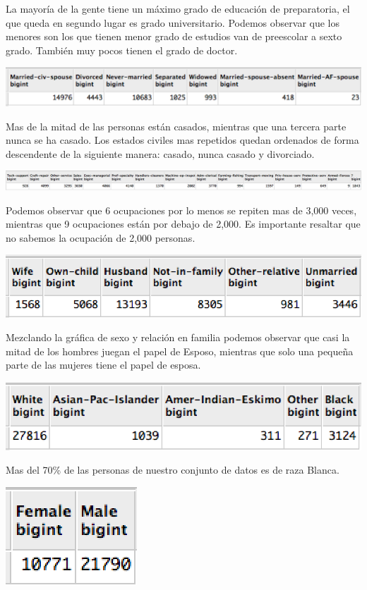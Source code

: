 \documentclass{article}
\begin{document}
  La mayoría de la gente tiene un máximo grado de educación de  preparatoria, el que queda en segundo lugar es grado universitario. Podemos observar que los menores son los que tienen menor grado de estudios van de preescolar a sexto grado. También muy pocos tienen el grado de doctor.
  \begin{center}
    \includegraphics[scale=0.5]{tablas/maritalstatus}
  \end{center}
  Mas de la mitad de las personas están casados, mientras que una tercera parte nunca se ha casado. Los estados civiles mas repetidos quedan ordenados de forma descendente de la siguiente manera: casado, nunca casado y divorciado.
  \begin{center}
    \includegraphics[scale=0.5]{tablas/occupation}
  \end{center}
  Podemos observar que 6 ocupaciones por lo menos se repiten mas de 3,000 veces, mientras que 9 ocupaciones están por debajo de 2,000. Es importante resaltar que no sabemos la ocupación de 2,000 personas.
  \begin{center}
    \includegraphics{tablas/relationship}
  \end{center}
  Mezclando la gráfica de sexo y relación en familia podemos observar que casi la mitad de los hombres juegan el papel de Esposo, mientras que solo una pequeña parte de las mujeres tiene el papel de esposa.
  \begin{center}
    \includegraphics{tablas/race}
  \end{center}
  Mas del 70\% de las personas de nuestro conjunto de datos es de raza Blanca.
  \begin{center}
    \includegraphics{tablas/sex}
  \end{center}
\end{document}
